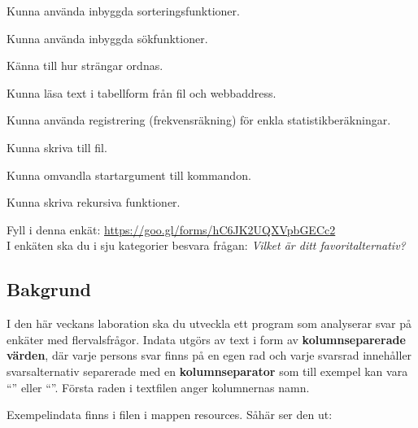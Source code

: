 

\Lab{\LabWeekTEN}

\begin{Goals}
\item Kunna använda inbyggda sorteringsfunktioner.
\item Kunna använda inbyggda sökfunktioner.
\item Känna till hur strängar ordnas.
\item Kunna läsa text i tabellform från fil och webbaddress.
\item Kunna använda registrering (frekvensräkning) för enkla statistikberäkningar.
\item Kunna skriva till fil.
\item Kunna omvandla startargument till kommandon.
\item Kunna skriva rekursiva funktioner.
\end{Goals}

\begin{Preparations}
\item {}
\item {}
\item \ReadTheLab
\item Fyll i denna enkät: \url{https://goo.gl/forms/hC6JK2UQXVpbGECc2}  \\
I enkäten ska du i sju kategorier besvara frågan: \textit{Vilket är ditt favoritalternativ?}
\end{Preparations}


\subsection{Bakgrund}

I den här veckans laboration ska du utveckla ett program som analyserar svar på enkäter med flervalsfrågor. Indata utgörs av text i form av \textbf{kolumnseparerade värden}, där varje persons svar finns på en egen rad och varje svarsrad innehåller svarsalternativ separerade med en \textbf{kolumnseparator} som till exempel kan vara ``\code{\t}'' eller ``\code{,}''. Första raden i textfilen anger kolumnernas namn.

Exempelindata finns i filen  i mappen resources. Såhär ser den ut:


